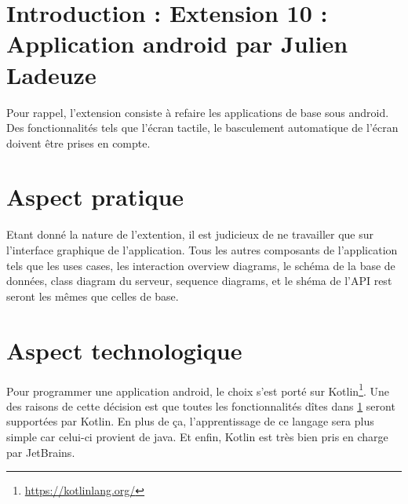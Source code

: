 \section{Introduction : Extension 10 : Application android par Julien Ladeuze}\label{INTRODUCTION}
\begin{flushleft}
Pour rappel, l'extension consiste à refaire les applications de base sous android. Des fonctionnalités tels que l'écran tactile, le basculement automatique de l'écran doivent être prises en compte.
\end{flushleft}
\section{Aspect pratique}
\begin{flushleft}
Etant donné la nature de l'extention, il est judicieux de ne travailler que sur l'interface graphique de l'application. Tous les autres composants de l'application tels que les uses cases, les interaction overview diagrams, le schéma de la base de données, class diagram du serveur, sequence diagrams, et le shéma de l'API rest seront les mêmes que celles de base.
\end{flushleft}
\section{Aspect technologique}
\begin{flushleft}
Pour programmer une application android, le choix s'est porté sur Kotlin\footnote{\url{https://kotlinlang.org/}}. Une des raisons de cette décision est que toutes les fonctionnalités dîtes dans \ref{INTRODUCTION} seront supportées par Kotlin. En plus de ça, l'apprentissage de ce langage sera plus simple car celui-ci provient de java. Et enfin, Kotlin est très bien pris en charge par JetBrains.
\end{flushleft}
